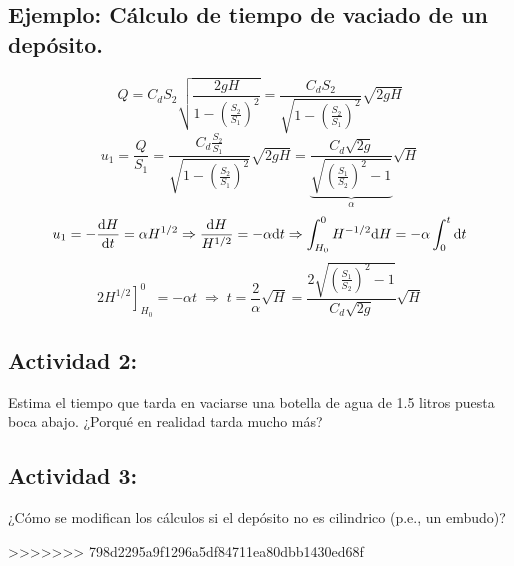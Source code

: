 	\subsection*{Ejemplo: Cálculo de tiempo de vaciado de un depósito.}
		\[
		Q=C_{d}S_{2}\sqrt{\frac{2gH}{1-\left(\frac{S_{2}}{S_{1}}\right)^{2}}}=\frac{C_{d}S_{2}}{\sqrt{1-\left(\frac{S_{2}}{S_{1}}\right)^{2}}}\sqrt{2gH}
		\]
		\[
		u_{1}=\frac{Q}{S_{1}}=\frac{C_{d}\frac{S_{2}}{S_{1}}}{\sqrt{1-\left(\frac{S_{2}}{S_{1}}\right)^{2}}}\sqrt{2gH}=\underbrace{\frac{C_{d}\sqrt{2g}}{\sqrt{\left(\frac{S_{1}}{S_{2}}\right)^{2}-1}}}_{\alpha}\sqrt{H}
		\]
		\[
		u_{1}=-\frac{\textrm{d} H}{\textrm{d} t}=\alpha H^{1/2}\Rightarrow\frac{\text{d} H}{H^{1/2}}=-\alpha\text{d} t\Rightarrow\int_{H_{0}}^{0}H^{-1/2}\text{d} H=-\alpha\int_{0}^{t}\text{d} t
		\]
		\[
		2\left.H^{1/2}\right]_{H_{0}}^{0}=-\alpha t\;\Rightarrow\;t=\frac{2}{\alpha}\sqrt{H}=\frac{2\sqrt{\left(\frac{S_{1}}{S_{2}}\right)^{2}-1}}{C_{d}\sqrt{2g}}\sqrt{H}
		\]

	
	\subsection*{Actividad 2:}
		Estima el tiempo que tarda en vaciarse una botella de agua de 1.5
		litros puesta boca abajo. ¿Porqué en realidad tarda mucho más?

	
	\subsection*{Actividad 3:}
		¿Cómo se modifican los cálculos si el depósito no es cilindrico (p.e.,
		un embudo)?

	
>>>>>>> 798d2295a9f1296a5df84711ea80dbb1430ed68f
